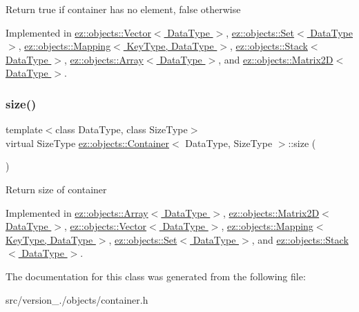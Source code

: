 Return true if container has no element, false otherwise 

Implemented in \hyperlink{classez_1_1objects_1_1Vector_a9fc4334b5da19dc41382f25b18c6e4bc}{ez\+::objects\+::\+Vector$<$ Data\+Type $>$}, \hyperlink{classez_1_1objects_1_1Set_a0b65ed5aee3fa32d0ddcb5a4a89f4dc3}{ez\+::objects\+::\+Set$<$ Data\+Type $>$}, \hyperlink{classez_1_1objects_1_1Mapping_a8c7cf83ebf29a35ab146e1a1d0955907}{ez\+::objects\+::\+Mapping$<$ Key\+Type, Data\+Type $>$}, \hyperlink{classez_1_1objects_1_1Stack_a62bd262732579e443d8147d2c2072801}{ez\+::objects\+::\+Stack$<$ Data\+Type $>$}, \hyperlink{classez_1_1objects_1_1Array_a281b310f3f9f4140520b84c2315b1352}{ez\+::objects\+::\+Array$<$ Data\+Type $>$}, and \hyperlink{classez_1_1objects_1_1Matrix2D_acab487d980231c63d1ea4dd6de734b2f}{ez\+::objects\+::\+Matrix2\+D$<$ Data\+Type $>$}.

\mbox{\label{classez_1_1objects_1_1Container_affd294810c6c29530d1d1e3c2151ad28}} 
\subsubsection{\texorpdfstring{size()}{size()}}
{\footnotesize\ttfamily template$<$class Data\+Type, class Size\+Type$>$ \\
virtual Size\+Type \hyperlink{classez_1_1objects_1_1Container}{ez\+::objects\+::\+Container}$<$ Data\+Type, Size\+Type $>$\+::size (\begin{DoxyParamCaption}{ }\end{DoxyParamCaption})\hspace{0.3cm}{\ttfamily [pure virtual]}}

Return size of container 

Implemented in \hyperlink{classez_1_1objects_1_1Array_af3ac644ccc4058fb2e13797af274a3de}{ez\+::objects\+::\+Array$<$ Data\+Type $>$}, \hyperlink{classez_1_1objects_1_1Matrix2D_a236462257912521cf98d8b5899f228f2}{ez\+::objects\+::\+Matrix2\+D$<$ Data\+Type $>$}, \hyperlink{classez_1_1objects_1_1Vector_a0c9401b7eb53dc1bff3becb8d87e5a90}{ez\+::objects\+::\+Vector$<$ Data\+Type $>$}, \hyperlink{classez_1_1objects_1_1Mapping_a223f5d523a0f3cc3eff5dc7cbf78ce29}{ez\+::objects\+::\+Mapping$<$ Key\+Type, Data\+Type $>$}, \hyperlink{classez_1_1objects_1_1Set_afb546d4097dc6a89b5c114922139619d}{ez\+::objects\+::\+Set$<$ Data\+Type $>$}, and \hyperlink{classez_1_1objects_1_1Stack_a470a691a71af423a7d30719fd71cd385}{ez\+::objects\+::\+Stack$<$ Data\+Type $>$}.



The documentation for this class was generated from the following file\+:\begin{DoxyCompactItemize}
\item 
src/version\+\_./objects/container.\+h\end{DoxyCompactItemize}
